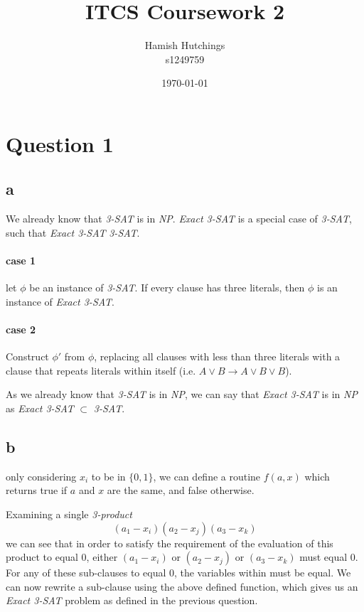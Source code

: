 \documentclass{article}
\title{ITCS Coursework 2}
\author{Hamish Hutchings  \\
  s1249759
  }
\date{\today}
\begin{document}
\maketitle


\section*{Question 1}

\subsection*{a}
\label{subsec:a}

We already know that \textit{3-SAT} is in \textit{NP}. \textit{Exact 3-SAT} is a
special case of \textit{3-SAT}, such that \textit{Exact 3-SAT} \subset \textit{3-SAT}.

\paragraph{case 1}
let $\phi$ be an instance of \textit{3-SAT}. If every clause has three literals,
then $\phi$ is an instance of \textit{Exact 3-SAT}.

\paragraph{case 2}
 Construct $\phi'$ from
$\phi$, replacing all clauses with less than three literals with a clause that
repeats literals within itself (i.e. $A \vee B \rightarrow A \vee B \vee B$).

As we already know that \textit{3-SAT} is in \textit{NP}, we can say that
\textit{Exact 3-SAT} is in \textit{NP} as \textit{Exact 3-SAT} $\subset$ \textit{3-SAT}.

\subsection*{b}
\label{subsec:b}
only considering $x_i$ to be in $\{0,1\}$, we can define a routine $f(a, x)$
which returns true if $a$ and $x$ are the same, and false otherwise.

Examining a single \textit{3-product}
\[
  (a_1 - x_i)(a_2-x_j)(a_3-x_k)
\]
we can see that in order to satisfy the requirement of the evaluation of this
product to equal 0, either $(a_1 - x_i)$ or $(a_2 - x_j)$ or $(a_3 - x_k)$ must
equal 0.
For any of these sub-clauses to equal 0, the variables within must be equal. We
can now rewrite a sub-clause using the above defined function, which gives us an
\textit{Exact 3-SAT} problem as defined in the previous question.
\end{document}
